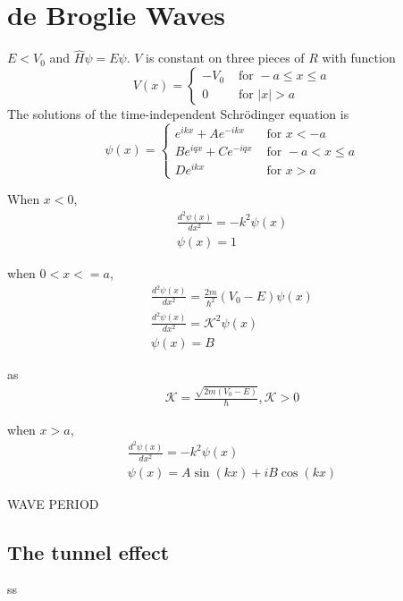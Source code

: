 \section{de Broglie Waves}
$E<V_0$ and $\hat{H}\psi = E\psi$. $V$ is constant on three pieces of $R$ with function
$$
V(x)= \begin{cases}-V_{0} & \text { for }-a \leq x \leq a \\ 0 & \text { for }|x|>a\end{cases}
$$
The solutions of the time-independent Schrödinger equation is 
$$
\psi(x)= \begin{cases}e^{i k x}+A e^{-i k x} & \text { for } x<-a \\ B e^{i q x}+C e^{-i q x} & \text { for }-a<x \leq a \\ D e^{i k x} & \text { for } x>a\end{cases}
$$

When $x<0$, 
\begin{align*}
    \frac{d^{2} \psi(x)}{d x^{2}} = -k^2 \psi(x)\\
    \psi(x) = 1  
\end{align*}

when $0<x<=a$,
\begin{gather}
    \frac{d^{2} \psi(x)}{d x^{2}} = \frac{2m}{\hbar^2}(V_0-E)\psi(x)\\
    \frac{d^{2} \psi(x)}{d x^{2}} = \mathcal{K} ^ 2 \psi(x)\\
    \psi(x) = B
\end{gather}

as
\begin{align}
    \boxed{
        \mathcal{K} = \frac{\sqrt{2m(V_0-E)}}{\hbar}, \mathcal{K} > 0 \label{14}
    }
\end{align}

when $x>a$,
\begin{align*}
    \frac{d^{2} \psi(x)}{d x^{2}} = -k^2\psi(x)\\
    \psi(x) = A\sin (kx) + i B \cos(kx)
\end{align*}

WAVE PERIOD 

\subsection{The tunnel effect}
ss